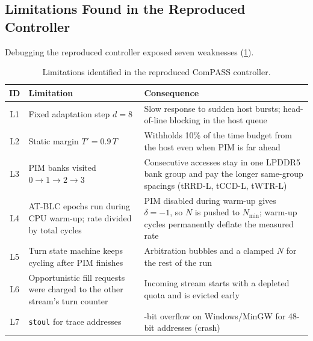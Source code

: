 \documentclass[conference]{IEEEtran}
\newcommand{\cmd}[1]{\texttt{\footnotesize #1}}
\begin{document}
\subsection{Limitations Found in the Reproduced Controller}
Debugging the reproduced controller exposed seven weaknesses (\cref{tab:limits}).

\begin{table}[!tbp]
\centering
\caption{Limitations identified in the reproduced ComPASS controller.}\label{tab:limits}
\footnotesize
\begin{tabularx}{\columnwidth}{@{}c>{\raggedright\arraybackslash}X>{\raggedright\arraybackslash}X@{}}
\toprule
\textbf{ID} & \textbf{Limitation} & \textbf{Consequence}\\
\midrule
L1 & Fixed adaptation step $d=8$ & Slow response to sudden host bursts; head-of-line blocking in the host queue\\
L2 & Static margin $T'=0.9\,T$ & Withholds 10\% of the time budget from the host even when PIM is far ahead\\
L3 & PIM banks visited $0\to1\to2\to3$ & Consecutive accesses stay in one LPDDR5 bank group and pay the longer same-group spacings (tRRD-L, tCCD-L, tWTR-L)\\
L4 & AT-BLC epochs run during CPU warm-up; rate divided by total cycles & PIM disabled during warm-up gives $\delta=-1$, so $N$ is pushed to $N_{\min}$; warm-up cycles permanently deflate the measured rate\\
L5 & Turn state machine keeps cycling after PIM finishes & Arbitration bubbles and a clamped $N$ for the rest of the run\\
L6 & Opportunistic fill requests were charged to the other stream's turn counter & Incoming stream starts with a depleted quota and is evicted early\\
L7 & \cmd{stoul} for trace addresses & 32-bit overflow on Windows/MinGW for 48-bit addresses (crash)\\
\bottomrule
\end{tabularx}
\end{table}
\end{document}
